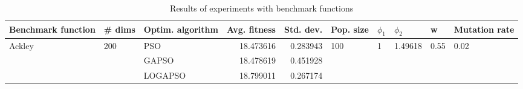 \begin{table}
\centering
\caption{Results of experiments with benchmark functions}
\begin{tabular}{lllrrlllll}
\toprule
     Benchmark function &              \# dims & Optim. algorithm &  Avg. fitness &  Std. dev. &            Pop. size &         $\phi_{1}$ &               $\phi_{2}$ &                     w &         Mutation rate \\
\midrule
\multirow{3}{*}{Ackley} & \multirow{3}{*}{200} &              PSO &     18.473616 &   0.283943 & \multirow{3}{*}{100} & \multirow{3}{*}{1} & \multirow{3}{*}{1.49618} & \multirow{3}{*}{0.55} & \multirow{3}{*}{0.02} \\
                        &                      &            GAPSO &     18.478619 &   0.451928 &                      &                    &                          &                       &                       \\
                        &                      &          LOGAPSO &     18.799011 &   0.267174 &                      &                    &                          &                       &                       \\
\bottomrule
\end{tabular}
\end{table}
